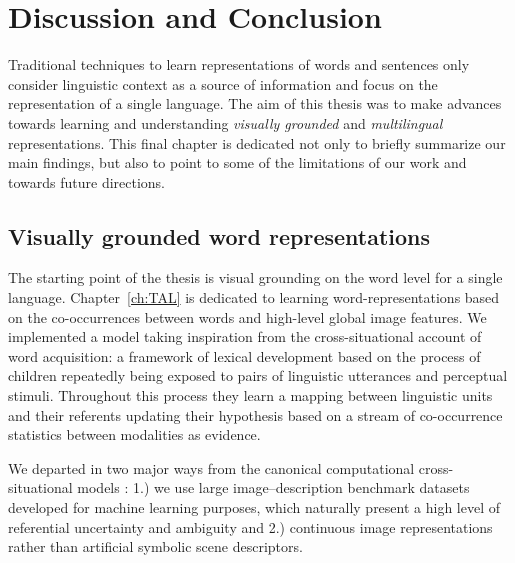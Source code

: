 \chapter{Discussion and Conclusion}
\label{ch:conclusion}

Traditional techniques to learn representations of words and sentences only consider 
linguistic context as a source of information and focus on the representation of a single language.
The aim of this thesis was to make advances towards learning 
and understanding \emph{visually grounded} and \emph{multilingual} representations. 
This final chapter is dedicated not only to briefly summarize our main findings, but also to 
point to some of the limitations of our work and towards future directions.


\section{Visually grounded word representations}
The starting point of the thesis is visual grounding on the word level for a single language.
Chapter~\ref{ch:TAL} is dedicated to learning word-representations based on the co-occurrences between 
words and high-level global image features. We implemented a model taking inspiration from
the cross-situational account of word acquisition: a framework of lexical development
based on the process of children repeatedly being exposed to pairs of linguistic utterances and 
perceptual stimuli.  Throughout this process they learn a mapping between linguistic 
units and their referents updating their hypothesis based on a stream of co-occurrence statistics
between modalities as evidence. 


We departed in two major ways from the canonical computational cross-situational models 
 \citep{siskind.96,fontanari2009cross,fazly.etal.10,kachergis2012associative,matusevych2013automatic,yu2013grounded}: 
1.) we use large image--description benchmark datasets developed for machine learning purposes, 
which naturally present a high level of referential uncertainty and ambiguity and
2.) continuous image representations rather than artificial symbolic scene descriptors.

